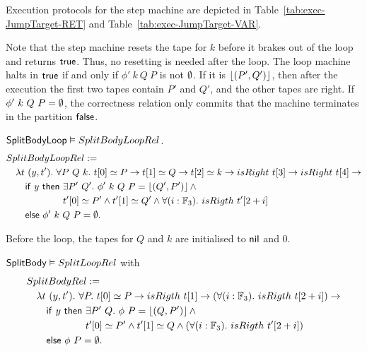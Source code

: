 Execution protocols for the step machine are depicted in Table~\ref{tab:exec-JumpTarget-RET} and Table~\ref{tab:exec-JumpTarget-VAR}.

Note that the step machine resets the tape for $k$ before it brakes out of the loop and returns $\mathsf{true}$.  Thus, no resetting is needed after the loop.
The loop machine halts in $\mathsf{true}$ if and only if $\phi'~k~Q~P$ is not $\emptyset$.  If it is $\left\lfloor {(P',Q')} \right\rfloor$, then after the execution the first two
tapes contain $P'$ and $Q'$, and the other tapes are right.  If $\phi'~k~Q~P = \emptyset$, the correctness relation only commits that the machine
terminates in the partition $\mathsf{false}$.
\begin{lemma}
  $\mathsf{SplitBodyLoop} \mathrel{\vDash} SplitBodyLoopRel$.
  \begin{alignat*}{1}
    & SplitBodyLoopRel := \\
    &\quad \lambda t~(y, t').~\forall P~Q~k.~t[0] \simeq P \rightarrow t[1] \simeq Q \rightarrow t[2] \simeq k \rightarrow isRight~t[3] \rightarrow isRight~t[4] \rightarrow \\
    &\quad\quad \MS{if}~y~\MS{then}~\exists P'~Q'.~ \phi'~k~Q~P = \Some{(Q', P')} \land \\
    &\quad\quad \phantom{\MS{if}~y~\MS{then}}~t'[0] \simeq P' \land t'[1] \simeq Q' \land \forall(i:\Fin_3).~isRigth~t'[2+i] \\
    &\quad\quad \MS{else}~\phi'~k~Q~P=\None.
\end{alignat*}
\end{lemma}

Before the loop, the tapes for $Q$ and $k$ are initialised to $\mathsf{nil}$ and $0$.
\begin{lemma}
  $\mathsf{SplitBody} \mathrel{\vDash} SplitLoopRel$ with
  \begin{alignat*}{1}
    & SplitBodyRel := \\
    &\quad \lambda t~(y, t').~\forall P.~t[0] \simeq P \rightarrow isRigth~t[1] \rightarrow (\forall(i:\Fin_3).~isRigth~t[2+i]) \rightarrow \\
    &\quad\quad \MS{if}~y~\MS{then}~\exists P'~Q.~ \phi~P = \Some{(Q, P')} \land \\
    &\quad\quad \phantom{\MS{if}~y~\MS{then}}~t'[0] \simeq P' \land t'[1] \simeq Q \land \left(\forall(i:\Fin_3).~isRigth~t'[2+i]\right) \\
    &\quad\quad \MS{else}~\phi~P=\None.
\end{alignat*}
\end{lemma}


